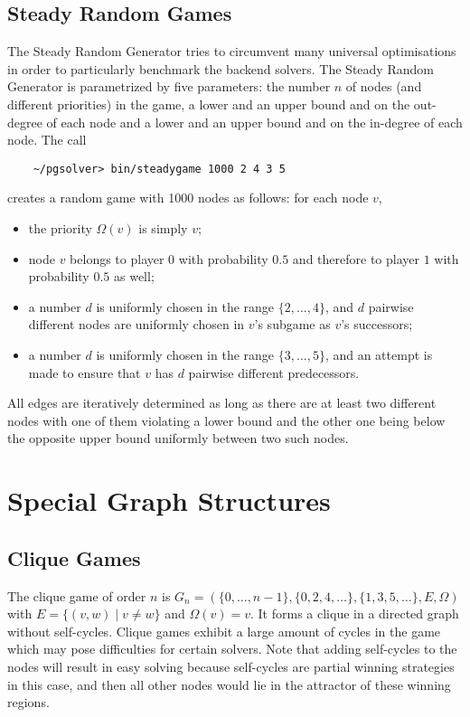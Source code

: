 \subsection{Steady Random Games}

The Steady Random Generator tries to circumvent many universal optimisations in order to particularly
benchmark the backend solvers. The Steady Random Generator is parametrized by five parameters: the number
$n$ of nodes (and different priorities) in the game, a lower and an upper bound and on the
out-degree of each node and a lower and an upper bound and on the in-degree of each node. The call
\begin{verbatim}
    ~/pgsolver> bin/steadygame 1000 2 4 3 5
\end{verbatim}
creates a random game with 1000 nodes as follows: for each node $v$,
\begin{itemize}
\item the priority $\Omega(v)$ is simply $v$;
\item node $v$ belongs to player $0$ with probability $0.5$ and therefore to player $1$ with
      probability $0.5$ as well;
\item a number $d$ is uniformly chosen in the range $\{2,\ldots,4\}$, and $d$ pairwise different
      nodes are uniformly chosen in $v$'s subgame as $v$'s successors;
\item a number $d$ is uniformly chosen in the range $\{3,\ldots,5\}$, and an attempt is made to ensure
      that $v$ has $d$ pairwise different predecessors.
\end{itemize}
All edges are iteratively determined as long as there are at least two different nodes with one of them violating
a lower bound and the other one being below the opposite upper bound uniformly between two such nodes.


\section{Special Graph Structures}

\subsection{Clique Games}

The clique game of order $n$ is $G_n = (\{0,\ldots,n-1\},\{0,2,4,\ldots\},\{1,3,5,\ldots\},E,\Omega)$
with $E = \{ (v,w) \mid v \ne w \}$ and $\Omega(v) = v$. It forms a clique in a directed graph without
self-cycles. Clique games exhibit a large amount of cycles in the game which may pose difficulties
for certain solvers. Note that adding self-cycles to the nodes will result in easy solving because
self-cycles are partial winning strategies in this case, and then all other nodes would lie in the attractor
of these winning regions.

